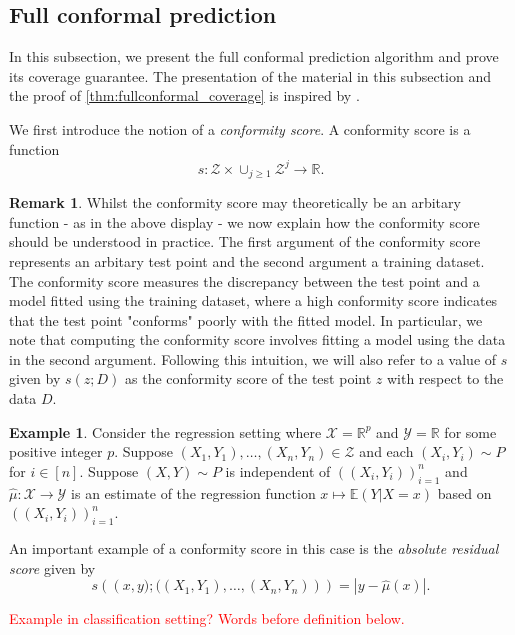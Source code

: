 \documentclass[11pt, titlepage]{article} %
\newcommand{\Exp}[3]{\mathbb{E}\left#2 #1 \right#3}
\numberwithin{equation}{section}
\theoremstyle{definition}
\newtheorem{remark}{Remark}
\newtheorem{example}{Example}
\numberwithin{theorem}{section}
\numberwithin{lemma}{section}
\numberwithin{corollary}{section}
\numberwithin{proposition}{section}
\numberwithin{definition}{section}
\numberwithin{remark}{section}
\begin{document}
\subsection{Full conformal prediction}
\label{subsec:fullconformal}

In this subsection, we present the full conformal prediction algorithm and prove its coverage guarantee. The presentation of the material in this subsection and the proof of \cref{thm:fullconformal_coverage} is inspired by \cite{angelopoulos2024theoreticalfoundationsconformalprediction}. \vskip5pt

\noindent
We first introduce the notion of a \textit{conformity score}. A conformity score is a function \[s:\mathcal{Z} \times \cup_{j \geq 1} \mathcal{Z}^j \to \mathbb{R}.\]

\begin{remark}
    Whilst the conformity score may theoretically be an arbitary function - as in the above display - we now explain how the conformity score should be understood in practice. The first argument of the conformity score represents an arbitary test point and the second argument a training dataset. The conformity score measures the discrepancy between the test point and a model fitted using the training dataset, where a high conformity score indicates that the test point "conforms" poorly with the fitted model. In particular, we note that computing the conformity score involves fitting a model using the data in the second argument. Following this intuition, we will also refer to a value of \(s\) given by \(s(z;D)\) as the conformity score of the test point \(z\) with respect to the data \(D\).
\label{rmk:conformity_score_intuition}
\end{remark}

\begin{example}
\label{example:absolute_residual_score}
    Consider the regression setting where \(\mathcal{X} = \mathbb{R}^p\) and \(\mathcal{Y} = \mathbb{R}\) for some positive integer \(p\). Suppose \((X_1, Y_1), \ldots, (X_n, Y_n) \in \mathcal{Z}\) and each \((X_i, Y_i) \sim P\) for \(i \in [n]\). Suppose \((X,Y) \sim P\) is independent of \(((X_i, Y_i))_{i=1}^n\) and \(\hat{\mu}: \mathcal{X} \to \mathcal{Y}\) is an estimate of the regression function \(x \mapsto \Exp{Y|X = x}{(}{)}\) based on \(((X_i, Y_i))_{i=1}^n\). \vskip5pt

    \noindent
    An important example of a conformity score in this case is the \textit{absolute residual score} given by \[s\left(\left(x,y); ((X_1, Y_1), \ldots, (X_n, Y_n)\right)\right) = |y - \hat{\mu}(x)|.\]
\end{example} \textcolor{red}{Example in classification setting?}
\textcolor{red}{Words before definition below.} 
\end{document}
